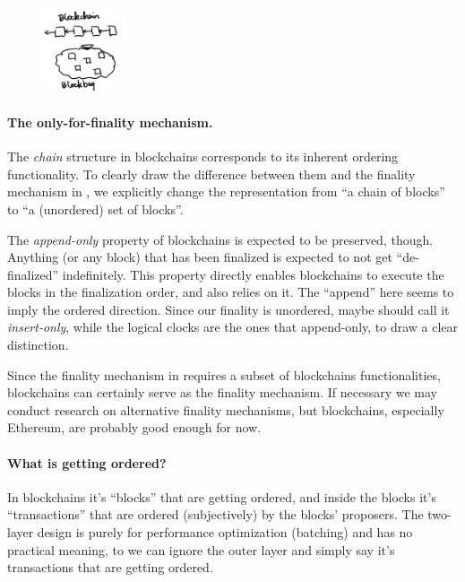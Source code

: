 \begin{figure}
    \includegraphics[width=0.2\textwidth]{graphs/IMG_0066}
\end{figure}

\paragraph{The only-for-finality mechanism.}
The \emph{chain} structure in blockchains corresponds to its inherent ordering functionality.
To clearly draw the difference between them and the finality mechanism in \sys, we explicitly change the representation from ``a chain of blocks'' to ``a (unordered) set of blocks''.

The \emph{append-only} property of blockchains is expected to be preserved, though.
Anything (or any block) that has been finalized is expected to not get ``de-finalized'' indefinitely.
This property directly enables blockchains to execute the blocks in the finalization order, and \sys also relies on it.
The ``append'' here seems to imply the ordered direction.
Since our finality is unordered, maybe should call it \emph{insert-only}, while the logical clocks are the ones that append-only, to draw a clear distinction.

Since the finality mechanism in \sys requires a subset of blockchains functionalities, blockchains can certainly serve as the finality mechanism.
If necessary we may conduct research on alternative finality mechanisms, but blockchains, especially Ethereum, are probably good enough for now.

\paragraph{What is getting ordered?}
In blockchains it's ``blocks'' that are getting ordered, and inside the blocks it's ``transactions'' that are ordered (subjectively) by the blocks' proposers.
The two-layer design is purely for performance optimization (\ie batching) and has no practical meaning, to we can ignore the outer layer and simply say it's transactions that are getting ordered.

